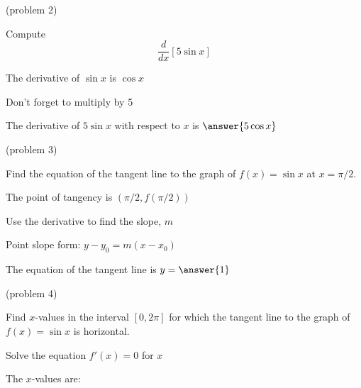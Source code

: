 \documentclass[handout]{ximera}
\begin{document}
\begin{problem}(problem 2)
  
Compute 
\[
\frac{d}{dx} \left[5\sin x\right]
\]
  
\begin{hint}
The derivative of $\sin x$ is $\cos x$
\end{hint}
\begin{hint}
Don't forget to multiply by 5
\end{hint}
		
The derivative of $5\sin x$ with respect to $x$ is
$\answer{5\cos x}$

\end{problem}


\begin{problem}(problem 3)

Find the equation of the tangent line to the graph of $f(x) = \sin x$ at $x=\pi/2.$

\begin{hint}
The point of tangency is $(\pi/2, f(\pi/2))$
\end{hint}
\begin{hint}
Use the derivative to find the slope, $m$
\end{hint}
\begin{hint}
Point slope form: $y-y_0 = m(x-x_0)$
\end{hint}

The equation of the tangent line is  $y = \answer{1}$

\end{problem}



\begin{problem}(problem 4)

Find $x$-values in the interval $[0, 2\pi]$ for which the tangent line to the 
graph of $f(x) = \sin x$ is horizontal.


\begin{hint}
Solve the equation $f'(x) = 0$ for $x$
\end{hint}

The $x$-values are:
\begin{multipleChoice}
\end{multipleChoice}

\end{problem}




\end{document}
